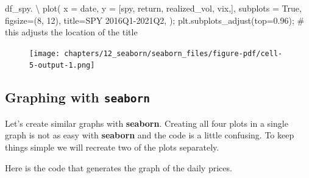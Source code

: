 \documentclass[
  letterpaper,
  DIV=11,
  numbers=noendperiod]{scrreprt}
\newenvironment{Shaded}{\begin{snugshade}}{\end{snugshade}}
\newcommand{\CommentTok}[1]{\textcolor[rgb]{0.37,0.37,0.37}{#1}}
\newcommand{\DecValTok}[1]{\textcolor[rgb]{0.68,0.00,0.00}{#1}}
\newcommand{\FloatTok}[1]{\textcolor[rgb]{0.68,0.00,0.00}{#1}}
\newcommand{\NormalTok}[1]{\textcolor[rgb]{0.00,0.23,0.31}{#1}}
\newcommand{\OperatorTok}[1]{\textcolor[rgb]{0.37,0.37,0.37}{#1}}
\newcommand{\StringTok}[1]{\textcolor[rgb]{0.13,0.47,0.30}{#1}}
\newcommand{\VariableTok}[1]{\textcolor[rgb]{0.07,0.07,0.07}{#1}}
\begin{document}
\begin{Shaded}
\begin{Highlighting}[]
\NormalTok{df\_spy. }\OperatorTok{\textbackslash{}}
\NormalTok{    plot(}
\NormalTok{        x }\OperatorTok{=} \StringTok{\textquotesingle{}date\textquotesingle{}}\NormalTok{, }
\NormalTok{        y }\OperatorTok{=}\NormalTok{ [}\StringTok{\textquotesingle{}spy\textquotesingle{}}\NormalTok{, }\StringTok{\textquotesingle{}return\textquotesingle{}}\NormalTok{, }\StringTok{\textquotesingle{}realized\_vol\textquotesingle{}}\NormalTok{, }\StringTok{\textquotesingle{}vix\textquotesingle{}}\NormalTok{,],}
\NormalTok{        subplots }\OperatorTok{=} \VariableTok{True}\NormalTok{,}
\NormalTok{        figsize}\OperatorTok{=}\NormalTok{(}\DecValTok{8}\NormalTok{, }\DecValTok{12}\NormalTok{),}
\NormalTok{        title}\OperatorTok{=}\StringTok{\textquotesingle{}SPY 2016Q1{-}2021Q2\textquotesingle{}}\NormalTok{,}
\NormalTok{    )}\OperatorTok{;}
\NormalTok{plt.subplots\_adjust(top}\OperatorTok{=}\FloatTok{0.96}\NormalTok{)}\OperatorTok{;} \CommentTok{\# this adjusts the location of the title}
\end{Highlighting}
\end{Shaded}

\begin{figure}[H]

{\centering \texttt{[image: chapters/12\_seaborn/seaborn\_files/figure-pdf/cell-5-output-1.png]}

}

\end{figure}

\hypertarget{graphing-with-seaborn}{%
\subsection{\texorpdfstring{Graphing with
\texttt{seaborn}}{Graphing with seaborn}}\label{graphing-with-seaborn}}

Let's create similar graphs with \textbf{seaborn}. Creating all four
plots in a single graph is not as easy with \textbf{seaborn} and the
code is a little confusing. To keep things simple we will recreate two
of the plots separately.

Here is the code that generates the graph of the daily prices.
\end{document}
